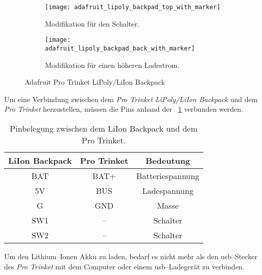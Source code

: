 \begin{figure}
	\centering
	\begin{subfigure}[t]{0.3\linewidth}
		\texttt{[image: adafruit\_lipoly\_backpad\_top\_with\_marker]}
		\caption{Modifikation für den Schalter.}
		\label{fig:pro_trinket_liion_backpack_top}
	\end{subfigure}
	\qquad
	\begin{subfigure}[t]{0.3\linewidth}
		\texttt{[image: adafruit\_lipoly\_backpad\_back\_with\_marker]}
		\caption{Modifikation für einen höheren Ladestrom.}
		\label{fig:pro_trinket_liion_backpack_bottom}
	\end{subfigure}
	\caption{Adafruit Pro Trinket LiPoly/LiIon Backpack}
	\label{fig:pro_trinket_liion_backpack}
\end{figure}

Um eine Verbindung zwischen dem \textit{Pro Trinket LiPoly/LiIon Backpack} und dem \textit{Pro Trinket} herzustellen, müssen die Pins anhand der \tablename~\ref{tab:pin_assignment_between_liion_backpack_and_pro_trinket} verbunden werden.

\begin{table}
	\centering
	\begin{tabular}{||c|c|c||} 
		\hline
		LiIon Backpack&Pro Trinket&Bedeutung\\\hline
		\hline
		BAT & BAT+ & Batteriespannung\\\hline
		5V & BUS & Ladespannung\\\hline
		G & GND & Masse\\\hline
		\hline
		SW1 & -- & Schalter\\\hline
		SW2 & -- & Schalter\\\hline
	\end{tabular}
	\caption{Pinbelegung zwischen dem LiIon Backpack und dem Pro Trinket.}
	\label{tab:pin_assignment_between_liion_backpack_and_pro_trinket}
\end{table}

Um den Lithium--Ionen Akku zu laden, bedarf es nicht mehr als den \Gls{usb}--Stecker des \textit{Pro Trinket} mit dem Computer oder einem \Gls{usb}--Ladegerät zu verbinden.


\begin{comment}
------------------------------------------------------------------------------------------
\end{comment}
